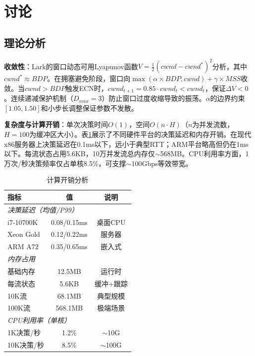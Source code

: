 \documentclass[10pt,twocolumn]{article}
\begin{document}
\section{讨论}

\subsection{理论分析}

\textbf{收敛性}：Lark的窗口动态可用Lyapunov函数$V = \frac{1}{2}(cwnd - cwnd^*)^2$分析，其中$cwnd^* \approx BDP$。在拥塞避免阶段，窗口向$\max(\alpha \times BDP, cwnd) + \gamma \times MSS$收敛。当$cwnd > BDP$触发ECN时，$cwnd_{t+1} = 0.85 \cdot cwnd_t < cwnd_t$，保证$\Delta V < 0$。连续递减保护机制（$D_{max}=3$）防止窗口过度收缩导致的振荡。$\alpha$的边界约束$[1.05, 1.50]$和小步长调整保证参数不发散。

\textbf{复杂度与计算开销}：单次决策时间$O(1)$，空间$O(n \cdot H)$（$n$为并发流数，$H=100$为缓冲区大小）。表\ref{tab:overhead}展示了不同硬件平台的决策延迟和内存开销。在现代x86服务器上决策延迟在0.1ms以下，远小于典型RTT；ARM平台略高但仍在1ms以下。每流状态占用5.6KB，10万并发流总内存仅$\sim$568MB。CPU利用率方面，1万次/秒决策频率仅占单核8.5\%，可支撑$\sim$100Gbps等效带宽。

\begin{table}[htbp]
\centering
\caption{计算开销分析}
\label{tab:overhead}
\small
\begin{tabular}{p{2.6cm}cc}
\toprule
\textbf{指标} & \textbf{值} & \textbf{说明} \\
\midrule
\multicolumn{3}{l}{\textit{决策延迟（均值/P99）}} \\
i7-10700K & 0.08/0.15ms & 桌面CPU \\
Xeon Gold & 0.12/0.22ms & 服务器 \\
ARM A72 & 0.35/0.65ms & 嵌入式 \\
\midrule
\multicolumn{3}{l}{\textit{内存占用}} \\
基础内存 & 12.5MB & 运行时 \\
每流状态 & 5.6KB & 缓冲+跟踪 \\
10K流 & 68.1MB & 典型规模 \\
100K流 & 568.1MB & 极端场景 \\
\midrule
\multicolumn{3}{l}{\textit{CPU利用率（单核）}} \\
1K决策/秒 & 1.2\% & $\sim$10G \\
10K决策/秒 & 8.5\% & $\sim$100G \\
\bottomrule
\end{tabular}
\end{table}
\end{document}
